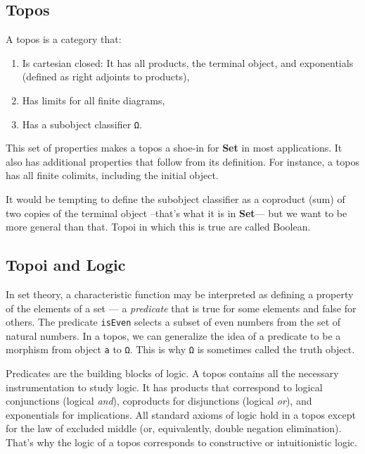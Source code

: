 \subsection{Topos}\label{topos}

A topos is a category that:

\begin{enumerate}
\tightlist
\item
  Is cartesian closed: It has all products, the terminal object, and
  exponentials (defined as right adjoints to products),
\item
  Has limits for all finite diagrams,
\item
  Has a subobject classifier \texttt{Ω}.
\end{enumerate}

This set of properties makes a topos a shoe-in for \textbf{Set} in most
applications. It also has additional properties that follow from its
definition. For instance, a topos has all finite colimits, including the
initial object.

It would be tempting to define the subobject classifier as a coproduct
(sum) of two copies of the terminal object --that's what it is in
\textbf{Set}--- but we want to be more general than that. Topoi in which
this is true are called Boolean.

\subsection{Topoi and Logic}\label{topoi-and-logic}

In set theory, a characteristic function may be interpreted as defining
a property of the elements of a set --- a \emph{predicate} that is true
for some elements and false for others. The predicate \texttt{isEven}
selects a subset of even numbers from the set of natural numbers. In a
topos, we can generalize the idea of a predicate to be a morphism from
object \texttt{a} to \texttt{Ω}. This is why \texttt{Ω} is sometimes
called the truth object.

Predicates are the building blocks of logic. A topos contains all the
necessary instrumentation to study logic. It has products that
correspond to logical conjunctions (logical \emph{and}), coproducts for
disjunctions (logical \emph{or}), and exponentials for implications. All
standard axioms of logic hold in a topos except for the law of excluded
middle (or, equivalently, double negation elimination). That's why the
logic of a topos corresponds to constructive or intuitionistic logic.

